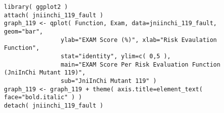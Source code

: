 \begin{lstlisting}
library( ggplot2 )
attach( jniinchi_119_fault )
graph_119 <- qplot( Function, Exam, data=jniinchi_119_fault, geom="bar", 
			  	ylab="EXAM Score (%)", xlab="Risk Evaulation Function", 
				stat="identity", ylim=c( 0,5 ),
				main="EXAM Score Per Risk Evaluation Function (JniInChi Mutant 119)",
				sub="JniInChi Mutant 119" )
graph_119 <- graph_119 + theme( axis.title=element_text( face="bold.italic" ) )
detach( jniinchi_119_fault )
\end{lstlisting}
